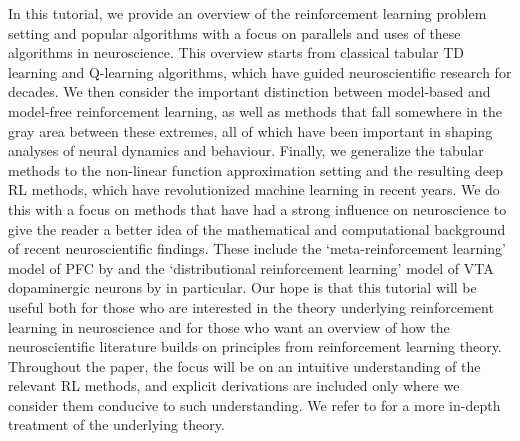 In this tutorial, we provide an overview of the reinforcement learning problem setting and popular algorithms with a focus on parallels and uses of these algorithms in neuroscience.
This overview starts from classical tabular TD learning and Q-learning algorithms, which have guided neuroscientific research for decades.
We then consider the important distinction between model-based and model-free reinforcement learning, as well as methods that fall somewhere in the gray area between these extremes, all of which have been important in shaping analyses of neural dynamics and behaviour.
Finally, we generalize the tabular methods to the non-linear function approximation setting and the resulting deep RL methods, which have revolutionized machine learning in recent years.
We do this with a focus on methods that have had a strong influence on neuroscience to give the reader a better idea of the mathematical and computational background of recent neuroscientific findings.
These include the `meta-reinforcement learning' model of PFC by \citet{wang2018prefrontal} and the `distributional reinforcement learning' model of VTA dopaminergic neurons by \citet{dabney2020distributional} in particular.
Our hope is that this tutorial will be useful both for those who are interested in the theory underlying reinforcement learning in neuroscience and for those who want an overview of how the neuroscientific literature builds on principles from reinforcement learning theory.
Throughout the paper, the focus will be on an intuitive understanding of the relevant RL methods, and explicit derivations are included only where we consider them conducive to such understanding.
We refer to \citet{sutton2018reinforcement} for a more in-depth treatment of the underlying theory.


